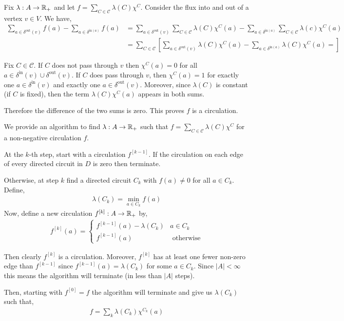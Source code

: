 \documentclass[10pt]{article}
\begin{document}
\begin{solution}

Fix \( \lambda:A\to\mathbb{R}_+ \) and let \( f = \sum_{C\in\mathcal{C}} \lambda(C) \chi^C \). Consider the flux into and out of a vertex \( v\in V \). We have,
\begin{align*}
    \sum_{a\in \delta^{\text{out}}(v) } f(a) - \sum_{a\in \delta^{\text{in}(a)}} f(a) &= 
    \sum_{a\in \delta^{\text{out}}(v) } \sum_{C\in \mathcal{C} } \lambda(C)\chi^C(a) - \sum_{a\in \delta^{\text{in}(a)}} \sum_{C\in \mathcal{C}} \lambda(c) \chi^C(a) 
    \\ &= 
    \sum_{C\in \mathcal{C} } \left[
        \sum_{a\in \delta^{\text{out}}(v) } \lambda(C)\chi^C(a) - \sum_{a\in \delta^{\text{in}(a)}} \lambda(C) \chi^C(a) = 
        \right]
\end{align*}

Fix \( C\in \mathcal{C} \). If \( C \) does not pass through \( v \) then \( \chi^C(a) = 0 \) for all \( a\in \delta^{\text{in}}(v)\cup \delta^{\text{out}}(v) \). If \( C \) does pass through \( v \), then \( \chi^C(a) = 1 \) for exactly one \( a\in \delta^{\text{in}}(v) \) and exactly one \( a\in\delta^{\text{out}}(v) \). Moreover, since \( \lambda(C) \) is constant (if \( C \) is fixed), then the term \( \lambda(C) \chi^{C}(a) \) appears in both sums. 

Therefore the difference of the two sums is zero. This proves \( f \) is a circulation.

We provide an algorithm to find \( \lambda : A\to\mathbb{R}_+ \) such that \( f = \sum_{C\in\mathcal{C}} \lambda(C)\chi^C\) for a non-negative circulation \( f \).

At the \( k \)-th step, start with a circulation \( f^{[k-1]} \). If the circulation on each edge of every directed circuit in \( D \) is zero then terminate.

Otherwise, at step \( k \) find a directed circuit \( C_k \) with \( f(a) \neq 0 \) for all \( a\in C_k \). Define,
\begin{align*}
    \lambda(C_k) = \min_{a\in C_k} f(a) 
\end{align*}
Now, define a new circulation \( f^{[k]}:A\to\mathbb{R}_+ \) by,
\begin{align*}
    f^{[k]}(a) = \begin{cases}
        f^{[k-1]}(a) - \lambda(C_k) & a\in C_k \\
        f^{[k-1]}(a) & \text{ otherwise}
    \end{cases}
\end{align*}

Then clearly \( f^{[k]} \) is a circulation. Moreover, \( f^{[k]} \) has at least one fewer non-zero edge than \( f^{[k-1]} \) since \( f^{[k-1]}(a) = \lambda(C_k) \) for some \( a\in C_k \). Since \( |A|<\infty \) this means the algorithm will terminate (in less than \( |A| \) steps).

Then, starting with \( f^{[0]} = f \) the algorithm will terminate and give us \( \lambda(C_k) \) such that,
\begin{align*}
    f = \sum_{k} \lambda(C_k)\chi^{C_k}(a)
\end{align*}

\end{solution}
\end{document}
